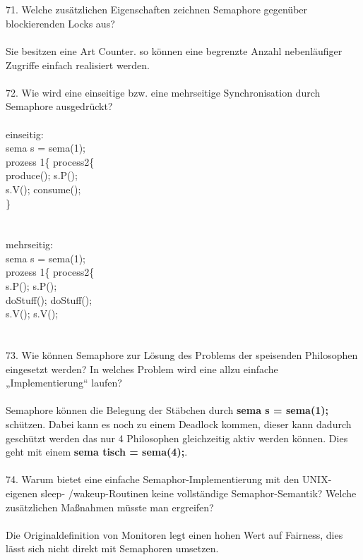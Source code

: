 \documentclass{article}
\newcommand\tab[1][1cm]{\hspace*{#1}}
\begin{document}
\\
\\
71. Welche zusätzlichen Eigenschaften zeichnen Semaphore gegenüber blockierenden Locks aus?
\\
\\
Sie besitzen eine Art Counter. so k\"onnen eine begrenzte Anzahl nebenl\"aufiger Zugriffe einfach realisiert werden.
\\
\\
72. Wie wird eine einseitige bzw. eine mehrseitige Synchronisation durch Semaphore ausgedrückt?
\\
\\
einseitig:\\
sema s = sema(1);\\
\tab prozess 1\{ \tab process2\{\\
\tab produce();  \tab s.P();\\
\tab s.V();   \tab consume();\\
\}\\
\\
\\
mehrseitig:\\
sema s = sema(1);\\
\tab prozess 1\{ \tab process2\{\\
\tab s.P();  \tab s.P();\\
\tab doStuff();  \tab doStuff();\\
\tab s.V();   \tab s.V();\\
\\
\\
73. Wie können Semaphore zur Lösung des Problems der speisenden Philosophen eingesetzt
werden? In welches Problem wird eine allzu einfache „Implementierung“ laufen?
\\
\\
Semaphore k\"onnen die Belegung der St\"abchen durch \textbf{sema s = sema(1);} sch\"utzen. Dabei kann es noch zu einem Deadlock kommen, dieser kann dadurch gesch\"utzt werden das nur 4 Philosophen gleichzeitig aktiv werden k\"onnen. Dies geht mit einem \textbf{sema tisch = sema(4);}.
\\
\\
74. Warum bietet eine einfache Semaphor-Implementierung mit den UNIX-eigenen sleep-
/wakeup-Routinen keine vollständige Semaphor-Semantik? Welche zusätzlichen Maßnahmen
müsste man ergreifen?
\\
\\
Die Originaldefinition von Monitoren legt einen hohen Wert auf Fairness, dies l\"asst sich nicht direkt mit Semaphoren umsetzen.\\
\end{document}
